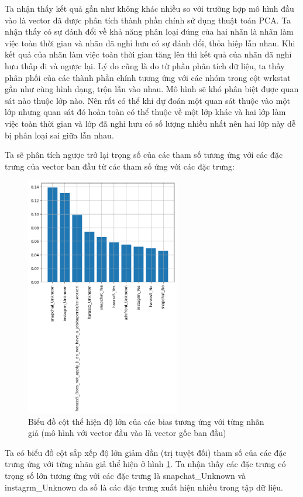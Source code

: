\begin{enumerate}[label=(\alph*)]
    Ta nhận thấy kết quả gần như không khác nhiều so với trường hợp mô hình đầu vào là vector đã được phân tích thành phần chính sử dụng thuật toán PCA.
    Ta nhận thấy có sự đánh đổi về khả năng phân loại đúng của hai nhãn là nhãn làm việc toàn thời gian và nhãn đã nghỉ hưu có sự đánh đổi, thỏa hiệp lẫn nhau.
    Khi kết quả của nhãn làm việc toàn thời gian tăng lên thì kết quả của nhãn đã nghỉ hưu thấp đi và ngược lại.
    Lý do cũng là do từ phần phân tích dữ liệu, ta thấy phân phối của các thành phần chính tương ứng với các nhóm trong cột wrkstat gần như cùng hình dạng, trộn lẫn vào nhau.
    Mô hình sẽ khó phân biệt được quan sát nào thuộc lớp nào.
    Nên rất có thể khi dự đoán một quan sát thuộc vào một lớp nhưng quan sát đó hoàn toàn có thể thuộc về một lớp khác và hai lớp làm việc toàn thời gian và lớp đã nghỉ hưu có số lượng nhiều nhất nên hai lớp này dễ bị phân loại sai giữa lẫn nhau.

    Ta sẽ phân tích ngược trở lại trọng số của các tham số tương ứng với các đặc trưng của vector ban đầu từ các tham số ứng với các đặc trưng:

    \begin{figure}[H]
        \centering
        \includegraphics[width=0.6\textwidth]{figures/Thanh/Models/Random_Forest/With_null_models_Feature_Importance_Random_Forest_original_features.png}
        \caption{Biểu đồ cột thể hiện độ lớn của các bias tương ứng với từng nhãn giả (mô hình với vector đầu vào là vector gốc ban đầu)}
        \label{fig:With_null_models_Feature_Importance_Random_Forest_original_features}
    \end{figure}
    
    Ta có biểu đồ cột sắp xếp độ lớn giảm dần (trị tuyệt đối) tham số của các đặc trưng ứng với từng nhãn giả thể hiện ở hình \ref{fig:With_null_models_Feature_Importance_Random_Forest_original_features}.
    Ta nhận thấy các đặc trưng có trọng số lớn tương ứng với các đặc trưng là snapchat\_Unknown và instagrm\_Unknown đa số là các đặc trưng xuất hiện nhiều trong tập dữ liệu.
\end{enumerate}
